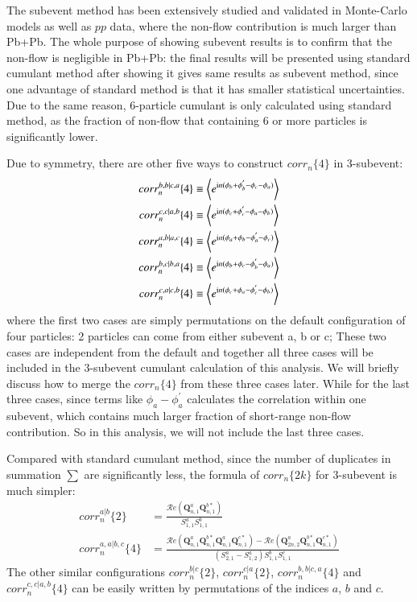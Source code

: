 The subevent method has been extensively studied and validated in Monte-Carlo models as well as $pp$ data, where the non-flow contribution is much larger than Pb+Pb. The whole purpose of showing subevent results is to confirm that the non-flow is negligible in Pb+Pb: the final results will be presented using standard cumulant method after showing it gives same results as subevent method, since one advantage of standard method is that it has smaller statistical uncertainties. Due to the same reason, 6-particle cumulant is only calculated using standard method, as the fraction of non-flow that containing 6 or more particles is significantly lower.

Due to symmetry, there are other five ways to construct $corr_n\{4\}$ in 3-subevent:
\begin{equation}
\begin{split}
corr_n^{b,b|c,a}\{4\}&\equiv \left\langle e^{\text{i}n(\phi_b+\phi_b^{'}-\phi_c-\phi_a)}\right\rangle \\
corr_n^{c,c|a,b}\{4\}&\equiv \left\langle e^{\text{i}n(\phi_c+\phi_c^{'}-\phi_a-\phi_b)}\right\rangle \\
corr_n^{a,b|a,c}\{4\}&\equiv \left\langle e^{\text{i}n(\phi_a+\phi_b-\phi_a^{'}-\phi_c)}\right\rangle \\
corr_n^{b,c|b,a}\{4\}&\equiv \left\langle e^{\text{i}n(\phi_b+\phi_c-\phi_b^{'}-\phi_a)}\right\rangle \\
corr_n^{c,a|c,b}\{4\}&\equiv \left\langle e^{\text{i}n(\phi_c+\phi_a-\phi_c^{'}-\phi_b)}\right\rangle
\end{split}
\end{equation}
where the first two cases are simply permutations on the default configuration of four particles: 2 particles can come from either subevent a, b or c; These two cases are independent from the default and together all three cases will be included in the 3-subevent cumulant calculation of this analysis. We will briefly discuss how to merge the $corr_n\{4\}$ from these three cases later. While for the last three cases, since terms like $\phi_a-\phi_a^{'}$ calculates the correlation within one subevent, which contains much larger fraction of short-range non-flow contribution. So in this analysis, we will not include the last three cases.

Compared with standard cumulant method, since the number of duplicates in summation $\sum$ are significantly less, the formula of $corr_n\{2k\}$ for 3-subevent is much simpler:
\begin{equation}
\begin{split}
corr_n^{a|b}\{2\}&=\frac{\mathcal{R}\textit{e}(\pmb{Q}_{n,1}^{a}\pmb{Q}_{n,1}^{b*})}{S_{1,1}^a S_{1,1}^b} \\
corr_n^{a,a|b,c}\{4\}&=\frac{\mathcal{R}\textit{e}(\pmb{Q}_{n,1}^a \pmb{Q}_{n,1}^{b*} \pmb{Q}_{n,1}^a \pmb{Q}_{n,1}^{c*})-\mathcal{R}\textit{e}(\pmb{Q}_{2n,2}^a \pmb{Q}_{n,1}^{b*} \pmb{Q}_{n,1}^{c*})}{(S_{2,1}^a-S_{1,2}^a)S_{1,1}^b S_{1,1}^c}
\end{split}
\end{equation}
The other similar configurations $corr_n^{b|c}\{2\}$, $corr_n^{c|a}\{2\}$, $corr_n^{b,b|c,a}\{4\}$ and $corr_n^{c,c|a,b}\{4\}$ can be easily written by permutations of the indices $a$, $b$ and $c$.


